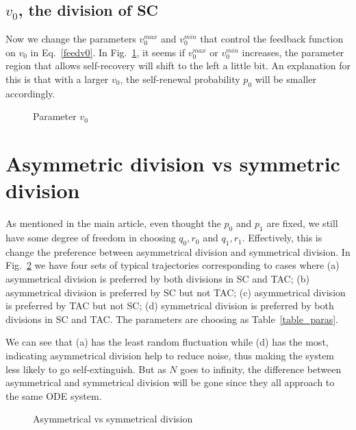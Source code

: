 \documentclass[12pt]{article}
\begin{document}
\subsection*{$v_0$, the division of SC}
Now we change the parameters $v_0^{max}$ and $v_0^{min}$ 
that control the feedback function on $v_0$ in Eq.~\eqref{feedv0}. 
In Fig.~\ref{afig_v0}, it seems if $v_0^{max}$ or $v_0^{min}$ increases, 
the parameter region that allows self-recovery will 
shift to the left a little bit. An explanation for this 
is that with a larger $v_0$, the self-renewal probability $p_0$ 
will be smaller accordingly.


\begin{figure}
\centering
{}
\caption{Parameter $v_0$}
\label{afig_v0}
\end{figure}


\section*{Asymmetric division vs symmetric division}
As mentioned in the main article, even thought the $p_0$
and $p_1$ are fixed, we still have some degree of freedom 
in choosing $q_0, r_0$ and $q_1, r_1$. Effectively, this is
change the preference between asymmetrical division and 
symmetrical division. In Fig.~\ref{afig_asm} we have four
sets of typical trajectories corresponding to cases where 
(a) asymmetrical division is preferred by 
both divisions in SC and TAC; (b) asymmetrical division 
is preferred by SC but not TAC; (c) asymmetrical division 
is preferred by TAC but not SC; (d) symmetrical division
is preferred by both divisions in SC and TAC. The parameters
are choosing as Table~\ref{table_paras}.

We can see that (a) has the least random fluctuation while
(d) has the most, indicating asymmetrical division help
to reduce noise, thus making the system less likely to go
self-extinguish. But as $N$ goes to infinity, the difference 
between asymmetrical and symmetrical division will be gone 
since they all approach to the same ODE system.

\begin{figure}
\centering
{}
\caption{Asymmetrical vs symmetrical division}
\label{afig_asm}
\end{figure}
\end{document}
